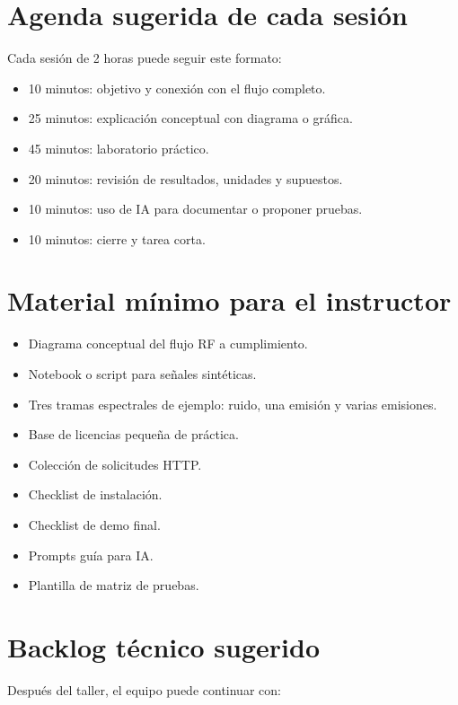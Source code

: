 \documentclass[11pt,a4paper]{article}
\begin{document}
\section*{Agenda sugerida de cada sesión}

Cada sesión de 2 horas puede seguir este formato:

\begin{itemize}
  \item 10 minutos: objetivo y conexión con el flujo completo.
  \item 25 minutos: explicación conceptual con diagrama o gráfica.
  \item 45 minutos: laboratorio práctico.
  \item 20 minutos: revisión de resultados, unidades y supuestos.
  \item 10 minutos: uso de IA para documentar o proponer pruebas.
  \item 10 minutos: cierre y tarea corta.
\end{itemize}

\section*{Material mínimo para el instructor}

\begin{itemize}
  \item Diagrama conceptual del flujo RF a cumplimiento.
  \item Notebook o script para señales sintéticas.
  \item Tres tramas espectrales de ejemplo: ruido, una emisión y varias emisiones.
  \item Base de licencias pequeña de práctica.
  \item Colección de solicitudes HTTP.
  \item Checklist de instalación.
  \item Checklist de demo final.
  \item Prompts guía para IA.
  \item Plantilla de matriz de pruebas.
\end{itemize}

\section*{Backlog técnico sugerido}

Después del taller, el equipo puede continuar con:
\end{document}

